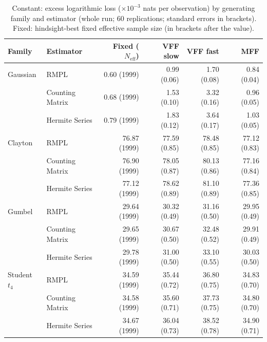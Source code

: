 \begin{table}[htbp]
\centering
\small
\caption{Constant: excess logarithmic loss ($\times10^{-3}$ nats per observation) by generating family and estimator (whole run; 60 replications; standard errors in brackets). Fixed: hindsight-best fixed effective sample size (in brackets after the value).}
\label{tab:app-strategy-excess-constant}
\begin{tabular}{llrrrr}
\toprule
Family & Estimator & Fixed ($N_{\mathrm{eff}}$) & VFF slow & VFF fast & MFF \\
\midrule
Gaussian & RMPL & 0.60 (1999) & 0.99 (0.06) & 1.70 (0.08) & 0.84 (0.04) \\
 & Counting Matrix & 0.68 (1999) & 1.53 (0.10) & 3.32 (0.16) & 0.96 (0.05) \\
 & Hermite Series & 0.79 (1999) & 1.83 (0.12) & 3.64 (0.17) & 1.03 (0.05) \\
\addlinespace
Clayton & RMPL & 76.87 (1999) & 77.59 (0.85) & 78.48 (0.85) & 77.12 (0.83) \\
 & Counting Matrix & 76.90 (1999) & 78.05 (0.87) & 80.13 (0.86) & 77.16 (0.84) \\
 & Hermite Series & 77.12 (1999) & 78.62 (0.89) & 81.10 (0.89) & 77.36 (0.85) \\
\addlinespace
Gumbel & RMPL & 29.64 (1999) & 30.32 (0.49) & 31.16 (0.50) & 29.95 (0.49) \\
 & Counting Matrix & 29.65 (1999) & 30.67 (0.50) & 32.48 (0.52) & 29.91 (0.49) \\
 & Hermite Series & 29.78 (1999) & 31.00 (0.50) & 33.10 (0.55) & 30.03 (0.50) \\
\addlinespace
Student $t_4$ & RMPL & 34.59 (1999) & 35.44 (0.72) & 36.80 (0.75) & 34.83 (0.70) \\
 & Counting Matrix & 34.58 (1999) & 35.60 (0.71) & 37.73 (0.75) & 34.80 (0.70) \\
 & Hermite Series & 34.67 (1999) & 36.04 (0.73) & 38.52 (0.78) & 34.90 (0.71) \\
\bottomrule
\end{tabular}
\end{table}

